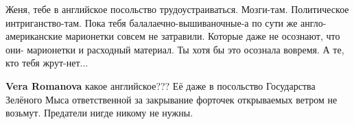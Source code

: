 \begin{itemize}
 

Женя, тебе в английское посольство трудоустраиваться. Мозги-там. Политическое
интриганство-там. Пока тебя балалаечно-вышиваночные-а по сути же
англо-американские марионетки совсем не затравили. Которые даже не осознают, что
они- марионетки и расходный материал. Ты хотя бы это осознала вовремя. А те, кто
тебя жрут-нет...

\begin{itemize} %
 
\textbf{Vera Romanova} какое английское??? Её даже в посольство Государства Зелёного Мыса ответственной за закрывание форточек открываемых ветром не возьмут. Предатели нигде никому не нужны.

 

\end{itemize}
\end{itemize}
